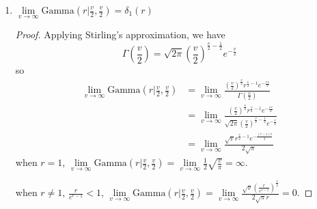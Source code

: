 \documentclass[10pt,a4paper]{article}
\begin{document}
\begin{enumerate}
\item
$\lim\limits_{v\rightarrow\infty} \mbox{Gamma}(r|\frac{v}{2}, \frac{v}{2})=\delta_1(r)$
\begin{proof}

Applying Stirling's approximation, we have
$$\Gamma(\frac{v}{2})=\sqrt{2\pi}(\frac{v}{2})^{\frac{v}{2}-\frac{1}{2}}e^{-\frac{v}{2}}$$
so 
\begin{equation}
\begin{aligned}
\lim\limits_{v\rightarrow\infty} \mbox{Gamma}(r|\frac{v}{2}, \frac{v}{2}) &= \lim\limits_{v\rightarrow\infty}\frac{(\frac{v}{2})^{\frac{v}{2}}r^{\frac{v}{2}-1}e^{-\frac{rv}{2}}}{\Gamma(\frac{v}{2})} \\
&= \lim\limits_{v\rightarrow\infty}\frac{(\frac{v}{2})^{\frac{v}{2}}r^{\frac{v}{2}-1}e^{-\frac{rv}{2}}}{\sqrt{2\pi}(\frac{v}{2})^{\frac{v}{2}-\frac{1}{2}}e^{-\frac{v}{2}}} \\
&= \lim\limits_{v\rightarrow\infty}\frac{\sqrt{v}r^{\frac{v}{2}-1}e^{-\frac{(r-1)v}{2}}}{2\sqrt{\pi}} 
\end{aligned}
\end{equation}
when $r=1$, $\lim\limits_{v\rightarrow\infty} \mbox{Gamma}(r|\frac{v}{2}, \frac{v}{2})=\lim\limits_{v\rightarrow\infty} \frac{1}{2}\sqrt{\frac{v}{\pi}}=\infty$.

when $r\ne 1$, $\frac{r}{e^{r-1}}<1$, 
$\lim\limits_{v\rightarrow\infty} \mbox{Gamma}(r|\frac{v}{2}, \frac{v}{2})=\lim\limits_{v\rightarrow\infty}\frac{\sqrt{v}\left(\frac{r}{e^{r-1}}\right)^{\frac{v}{2}}}{2\sqrt{\pi}r}=0$. 
\end{proof}


\end{enumerate}
\end{document}
